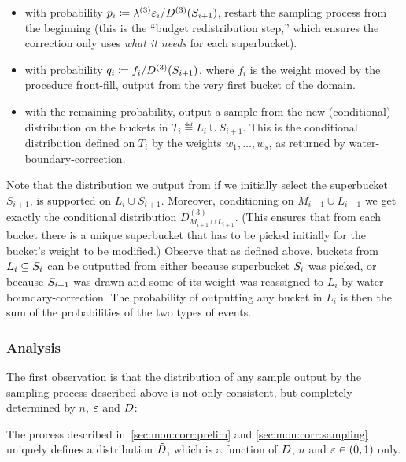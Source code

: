 \begin{itemize}
{\begin{itemize}
  \item with probability $p_i\coloneqq\lambda^{(3)}\varepsilon_i/D^{(3)}(S_{i+1})$, restart the sampling process from the beginning (this is the ``budget redistribution step,'' which ensures the correction only uses \emph{what it needs} for each superbucket).
  \item with probability  $q_i\coloneqq f_i/D^{(3)}(S_{i+1})$, where $f_i$ is the weight moved by the procedure \textsf{front-fill}, output {from} the very first {bucket} of the domain.      
    \item {with the remaining probability, output a sample from the new (conditional) distribution on the buckets in $T_i\eqdef L_i\cup S_{i+1}$. This is the conditional distribution defined {on $T_i$  by the weights $w_1,\dots, w_s$, as returned by} \textsf{water-boundary-correction}.}
  \end{itemize}
      } 
\end{itemize}
Note that the distribution we output from if we initially select the superbucket $S_{i+1}$, is supported on $L_i\cup S_{i+1}$. Moreover, conditioning on $M_{i+1}\cup L_{i+1}$ we get exactly the conditional distribution $D^{(3)}_{M_{i+1}\cup {L_{i+1}}}$. (This ensures that from each bucket there is a unique superbucket that has to be picked initially for the bucket's weight to be modified.) {Observe that as defined above, buckets from $L_i\subseteq S_i$ can be outputted from either because superbucket $S_i$ was picked, or because $S_{i+1}$ was drawn and some of its weight was reassigned to $L_i$ by \textsf{water-boundary-correction}. The probability of outputting any bucket in $L_i$ is then the sum of the probabilities of the two types of events.} 



\subsubsection{Analysis}

The first observation is that the distribution of any sample output by the sampling process described above is not only consistent, but completely determined by $n$, $\varepsilon$ and $D$:
\begin{claim}\label{lemma:correct:waterfill:defined}
The process described in~\cref{sec:mon:corr:prelim} and \ref{sec:mon:corr:sampling} uniquely defines a distribution $\tilde{D}$, which is a function of $D$, $n$ and $\varepsilon\in(0,1)$ only.
\end{claim}

